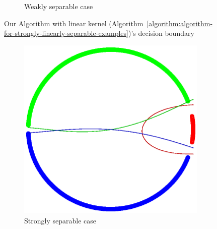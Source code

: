 \begin{figure}[h!]
\begin{subfigure}[b]{0.23\textwidth}
         \caption{Weakly separable case}
    \end{subfigure}
    \vspace*{-0.2cm}
    \caption{Our Algorithm with linear kernel (Algorithm~\ref{algorithm:algorithm-for-strongly-linearly-separable-examples})'s decision boundary}
    \label{fig:linearova-points}
\end{figure}

\begin{figure}[h!]
    \centering
    \begin{subfigure}[b]{0.23\textwidth}
        \captionsetup{justification=centering}
        \begin{center}
        \hspace*{-0.3cm} \includegraphics[width=1.15\textwidth, trim={0, 0cm, 0, 0}, clip]{figures/strong_rational_ova_points}
        \caption{Strongly separable case}
        \end{center}
    \end{subfigure}
    \hfill
    \begin{subfigure}[b]{0.23\textwidth}
        \captionsetup{justification=centering}
        \centering

\end{subfigure}
\end{figure}
